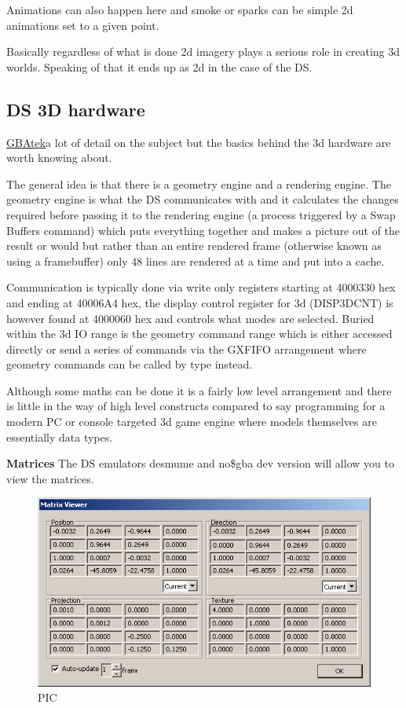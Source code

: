\documentclass[
]{book}
\begin{document}
Animations can also happen here and smoke or sparks can be simple 2d animations set to a given point.

Basically regardless of what is done 2d imagery plays a serious role in creating 3d worlds. Speaking of that it ends up as 2d in the case of the DS.

\hypertarget{ds-3d-hardware}{%
\subsection{DS 3D hardware}\label{ds-3d-hardware}}

\href{http://problemkaputt.de/gbatek.htm\#ds3dvideocontains}{GBAtek}a lot of detail on the subject but the basics behind the 3d hardware are worth knowing about.

The general idea is that there is a geometry engine and a rendering engine. The geometry engine is what the DS communicates with and it calculates the changes required before passing it to the rendering engine (a process triggered by a Swap Buffers command) which puts everything together and makes a picture out of the result or would but rather than an entire rendered frame (otherwise known as using a framebuffer) only 48 lines are rendered at a time and put into a cache.

Communication is typically done via write only registers starting at 4000330 hex and ending at 40006A4 hex, the display control register for 3d (DISP3DCNT) is however found at 4000060 hex and controls what modes are selected. Buried within the 3d IO range is the geometry command range which is either accessed directly or send a series of commands via the GXFIFO arrangement where geometry commands can be called by type instead.

Although some maths can be done it is a fairly low level arrangement and there is little in the way of high level constructs compared to say programming for a modern PC or console targeted 3d game engine where models themselves are essentially data types.

\textbf{Matrices} The DS emulators desmume and no\$gba dev version will allow you to view the matrices.

\begin{figure}
\centering
\includegraphics{images/61_home_fast6191_romhackingguide_unrenamed_file___l_borders_romhackingguidegraphics3dmatrix_1.png}
\caption{PIC}
\end{figure}
\end{document}
